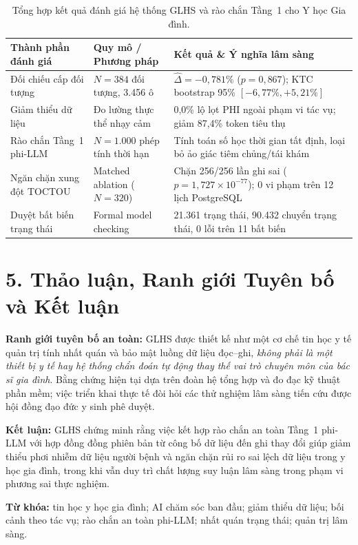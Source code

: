 \documentclass[11pt]{article}
\begin{document}
\begin{table}[H]\centering\small
\caption{Tổng hợp kết quả đánh giá hệ thống GLHS và rào chắn Tầng~1 cho Y học Gia đình.}
\vspace{0.4em}
\begin{tabularx}{\textwidth}{p{}p{}X}
\toprule
\textbf{Thành phần đánh giá} & \textbf{Quy mô / Phương pháp} & \textbf{Kết quả \& Ý nghĩa lâm sàng} \\
\midrule
Đối chiếu cấp đối tượng & $N=384$ đối tượng, 3.456 ô & $\hat{\Delta} = -0{,}781\%$ ($p=0{,}867$); KTC bootstrap 95\% $[-6{,}77\%, +5{,}21\%]$ \\
Giảm thiểu dữ liệu & Đo lường thực thể nhạy cảm & 0{,}0\% lộ lọt PHI ngoài phạm vi tác vụ; giảm 87{,}4\% token tiêu thụ \\
Rào chắn Tầng~1 phi-LLM & $N=1.000$ phép tính thời hạn & Tính toán số học thời gian tất định, loại bỏ ảo giác tiêm chủng/tái khám \\
Ngăn chặn xung đột TOCTOU & Matched ablation ($N=320$) & Chặn 256/256 lần ghi sai ($p=1{,}727 \times 10^{-77}$); 0 vi phạm trên 12 lịch PostgreSQL \\
Duyệt bất biến trạng thái & Formal model checking & 21.361 trạng thái, 90.432 chuyển trạng thái, 0 lỗi trên 11 bất biến \\
\bottomrule
\end{tabularx}
\end{table}

\section*{5. Thảo luận, Ranh giới Tuyên bố và Kết luận}
\textbf{Ranh giới tuyên bố an toàn:} GLHS được thiết kế như một cơ chế tin học y tế quản trị tính nhất quán và bảo mật luồng dữ liệu đọc--ghi, \emph{không phải là một thiết bị y tế hay hệ thống chẩn đoán tự động thay thế vai trò chuyên môn của bác sĩ gia đình}. Bằng chứng hiện tại dựa trên đoàn hệ tổng hợp và đo đạc kỹ thuật phần mềm; việc triển khai thực tế đòi hỏi các thử nghiệm lâm sàng tiến cứu được hội đồng đạo đức y sinh phê duyệt.

\textbf{Kết luận:} GLHS chứng minh rằng việc kết hợp rào chắn an toàn Tầng~1 phi-LLM với hợp đồng đồng phiên bản từ công bố dữ liệu đến ghi thay đổi giúp giảm thiểu phơi nhiễm dữ liệu người bệnh và ngăn chặn rủi ro sai lệch dữ liệu trong y học gia đình, trong khi vẫn duy trì chất lượng suy luận lâm sàng trong phạm vi phương sai thực nghiệm.

\textbf{Từ khóa:} tin học y học gia đình; AI chăm sóc ban đầu; giảm thiểu dữ liệu; bối cảnh theo tác vụ; rào chắn an toàn phi-LLM; nhất quán trạng thái; quản trị lâm sàng.
\end{document}
